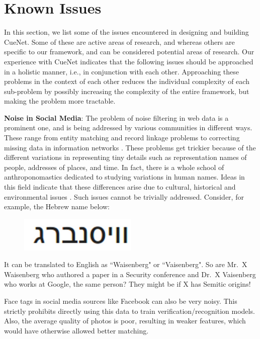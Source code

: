 \section{Known Issues}
In this section, we list some of the issues encountered in designing and building CueNet. Some of these are active areas of research, and whereas others are specific to our framework, and can be considered potential areas of research. Our experience with CueNet indicates that the following issues should be approached in a holistic manner, i.e., in conjunction with each other. Approaching these problems in the context of each other reduces the individual complexity of each sub-problem by possibly increasing the complexity of the entire framework, but making the problem more tractable.

\textbf{\textbf{Noise in Social Media}}: The problem of noise filtering in web data is a prominent one, and is being addressed by various communities in different ways. These range from entity matching and record linkage problems \cite{elmagarmid2007duplicate} to correcting missing data in information networks \cite{sadikov2011correcting}. These problems get trickier because of the different variations in representing tiny details such as representation names of people, addresses of places, and time. In fact, there is a whole school of anthroponomastics \cite{schneider2009s} dedicated to studying variations in human names. Ideas in this field indicate that these differences arise due to cultural, historical and environmental issues \cite{al2009socio}. Such issues cannot be trivially addressed. Consider, for example, the Hebrew name below:

\begin{figure}[h]
\centering
\includegraphics[width=0.5\textwidth]{media/ronen.png}
\label{fig:exp-general-loc-cx}
\end{figure}

It can be translated to English as ``Waisenberg" or ``Vaisenberg". So are Mr.\ X Waisenberg who authored a paper in a Security conference and Dr.\ X Vaisenberg who works at Google, the same person? They might be if X has Semitic origins!

Face tags in social media sources like Facebook can also be very noisy. This strictly prohibits directly using this data to train verification/recognition models. Also, the average quality of photos is poor, resulting in weaker features, which would have otherwise allowed better matching. 

